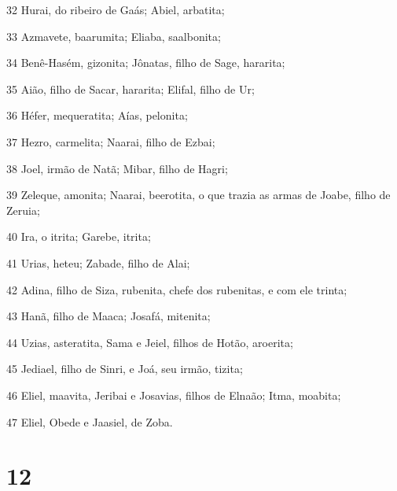 \par 32 Hurai, do ribeiro de Gaás; Abiel, arbatita;
\par 33 Azmavete, baarumita; Eliaba, saalbonita;
\par 34 Benê-Hasém, gizonita; Jônatas, filho de Sage, hararita;
\par 35 Aião, filho de Sacar, hararita; Elifal, filho de Ur;
\par 36 Héfer, mequeratita; Aías, pelonita;
\par 37 Hezro, carmelita; Naarai, filho de Ezbai;
\par 38 Joel, irmão de Natã; Mibar, filho de Hagri;
\par 39 Zeleque, amonita; Naarai, beerotita, o que trazia as armas de Joabe, filho de Zeruia;
\par 40 Ira, o itrita; Garebe, itrita;
\par 41 Urias, heteu; Zabade, filho de Alai;
\par 42 Adina, filho de Siza, rubenita, chefe dos rubenitas, e com ele trinta;
\par 43 Hanã, filho de Maaca; Josafá, mitenita;
\par 44 Uzias, asteratita, Sama e Jeiel, filhos de Hotão, aroerita;
\par 45 Jediael, filho de Sinri, e Joá, seu irmão, tizita;
\par 46 Eliel, maavita, Jeribai e Josavias, filhos de Elnaão; Itma, moabita;
\par 47 Eliel, Obede e Jaasiel, de Zoba.

\chapter{12}

